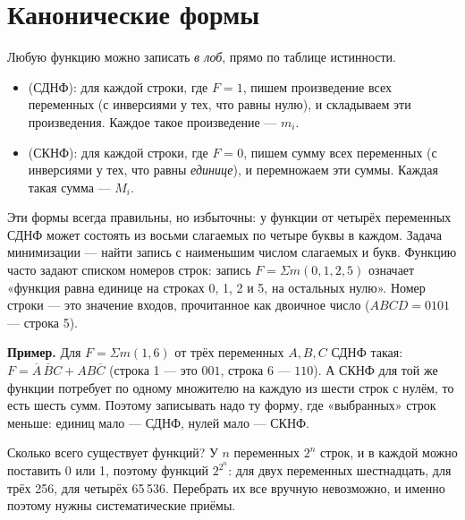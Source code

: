 \section{Канонические формы}

Любую функцию можно записать \emph{в лоб}, прямо по таблице истинности.

\begin{itemize}
  \item {} (СДНФ): для каждой
        строки, где $F=1$, пишем произведение всех переменных (с инверсиями у
        тех, что равны нулю), и складываем эти произведения.
        Каждое такое произведение ---  $m_i$.
  \item {} (СКНФ): для каждой
        строки, где $F=0$, пишем сумму всех переменных (с инверсиями у тех,
        что равны \emph{единице}), и перемножаем эти суммы. Каждая такая сумма
        ---  $M_i$.
\end{itemize}

Эти формы всегда правильны, но избыточны: у функции от четырёх переменных
СДНФ может состоять из восьми слагаемых по четыре буквы в каждом. Задача
минимизации --- найти запись с наименьшим числом слагаемых и букв.
Функцию часто задают списком номеров строк: запись $F=\Sigma m(0,1,2,5)$
означает «функция равна единице на строках 0, 1, 2 и 5, на остальных нулю».
Номер строки --- это значение входов, прочитанное как двоичное число
($ABCD=0101$ --- строка 5).

\textbf{Пример.} Для $F=\Sigma m(1,6)$ от трёх переменных $A,B,C$ СДНФ
такая: $F=\overline{A}\,\overline{B}C + AB\overline{C}$ (строка 1 --- это $001$,
строка 6 --- $110$). А СКНФ для той же функции потребует по одному
множителю на каждую из шести строк с нулём, то есть шесть сумм. Поэтому
записывать надо ту форму, где «выбранных» строк меньше: единиц мало --- СДНФ,
нулей мало --- СКНФ.

Сколько всего существует функций? У $n$ переменных $2^n$ строк, и в каждой
можно поставить 0 или 1, поэтому функций $2^{2^n}$: для двух переменных
шестнадцать, для трёх 256, для четырёх 65\,536. Перебрать их все
вручную невозможно, и именно поэтому нужны систематические приёмы.

